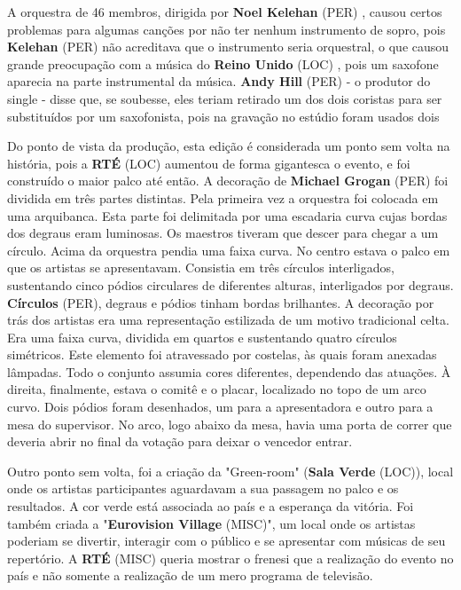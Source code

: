 \documentclass[12pt,a4paper]{article}
\begin{document}
A orquestra de 46 membros, dirigida por \textbf{Noel Kelehan} (PER) , causou certos problemas para algumas canções por não ter nenhum instrumento de sopro, pois \textbf{Kelehan} (PER) não acreditava que o instrumento seria orquestral, o que causou grande preocupação com a música do \textbf{Reino Unido} (LOC) , pois um saxofone aparecia na parte instrumental da música. \textbf{Andy Hill} (PER) - o produtor do single - disse que, se soubesse, eles teriam retirado um dos dois coristas para ser substituídos por um saxofonista, pois na gravação no estúdio foram usados dois

Do ponto de vista da produção, esta edição é considerada um ponto sem volta na história, pois a \textbf{RTÉ} (LOC) aumentou de forma gigantesca o evento, e foi construído o maior palco até então. A decoração de \textbf{Michael Grogan} (PER) foi dividida em três partes distintas. Pela primeira vez a orquestra foi colocada em uma arquibanca. Esta parte foi delimitada por uma escadaria curva cujas bordas dos degraus eram luminosas. Os maestros tiveram que descer para chegar a um círculo. Acima da orquestra pendia uma faixa curva. No centro estava o palco em que os artistas se apresentavam. Consistia em três círculos interligados, sustentando cinco pódios circulares de diferentes alturas, interligados por degraus. \textbf{Círculos} (PER), degraus e pódios tinham bordas brilhantes. A decoração por trás dos artistas era uma representação estilizada de um motivo tradicional celta. Era uma faixa curva, dividida em quartos e sustentando quatro círculos simétricos. Este elemento foi atravessado por costelas, às quais foram anexadas lâmpadas. Todo o conjunto assumia cores diferentes, dependendo das atuações. À direita, finalmente, estava o comitê e o placar, localizado no topo de um arco curvo. Dois pódios foram desenhados, um para a apresentadora e outro para a mesa do supervisor. No arco, logo abaixo da mesa, havia uma porta de correr que deveria abrir no final da votação para deixar o vencedor entrar.

Outro ponto sem volta, foi a criação da "Green-room" (\textbf{Sala Verde} (LOC)), local onde os artistas participantes aguardavam a sua passagem no palco e os resultados. A cor verde está associada ao país e a esperança da vitória. Foi também criada a "\textbf{Eurovision Village} (MISC)", um local onde os artistas poderiam se divertir, interagir com o público e se apresentar com músicas de seu repertório. A \textbf{RTÉ} (MISC) queria mostrar o frenesi que a realização do evento no país e não somente a realização de um mero programa de televisão.
\end{document}
